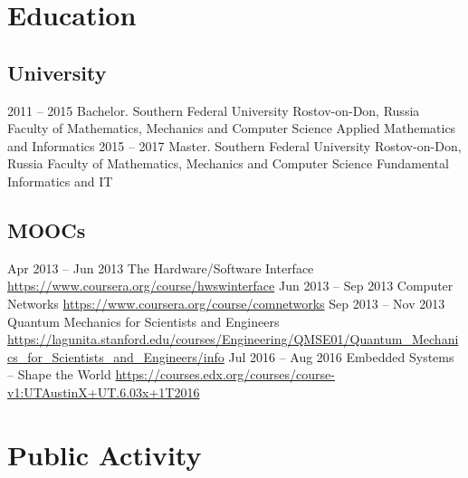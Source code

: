 \documentclass[11pt,a4paper]{moderncv}
\newcommand{\EngRus}[2]{#1}
\newcommand{\BirthPlaceOfValour}{\EngRus{Rostov-on-Don, Russia}{Ростов-на-Дону, Россия}}
\begin{document}
\pagebreak

\section{\EngRus{Education}{Образование}}
  \subsection{\EngRus{University}{Университет}}
    \cventry
      {2011 -- 2015}
      {\EngRus{Bachelor. Southern Federal University}{Бакалавриат. Южный Федеральный Университет}}
      {\BirthPlaceOfValour}
      {\EngRus{Faculty of Mathematics, Mechanics and Computer Science}
      {Институт математики, механики и компьютерных наук им. И.И. Воровича}}
      {\EngRus{Applied Mathematics and Informatics}{Прикладная математика и информатика}}
      {}
    \cventry
      {2015 -- 2017}
      {\EngRus{Master. Southern Federal University}{Магистратура. Южный Федеральный Университет}}
      {\BirthPlaceOfValour}
      {\EngRus{Faculty of Mathematics, Mechanics and Computer Science}
      {Институт математики, механики и компьютерных наук им. И.И. Воровича}}
      {\EngRus{Fundamental Informatics and IT}{Фундаментальная информатика и информационные технологии}}
      {}
  \subsection{\EngRus{MOOCs}{Онлайн курсы}}
    \cventry
      {\EngRus{Apr}{Апрель} 2013 -- \EngRus{Jun}{Июнь} 2013}
      {The Hardware/Software Interface}
      {\newline\url{https://www.coursera.org/course/hwswinterface}}
      {}{}{}
    \cventry
      {\EngRus{Jun}{Июнь} 2013 -- \EngRus{Sep}{Сентябрь} 2013}
      {Computer Networks}
      {\newline\url{https://www.coursera.org/course/comnetworks}}
      {}{}{}
    \cventry
      {\EngRus{Sep}{Сентябрь} 2013 -- \EngRus{Nov}{Ноябрь} 2013}
      {Quantum Mechanics for Scientists and Engineers}
      {\newline\url{https://lagunita.stanford.edu/courses/Engineering/QMSE01/Quantum_Mechanics_for_Scientists_and_Engineers/info}}
      {}{}{}
    \cventry
      {\EngRus{Jul}{Июль} 2016 -- \EngRus{Aug}{Август} 2016}
      {Embedded Systems -- Shape the World}
      {\newline\url{https://courses.edx.org/courses/course-v1:UTAustinX+UT.6.03x+1T2016}}
      {}{}{}

\section{\EngRus{Public Activity}{Публичная деятельность}}
\end{document}
